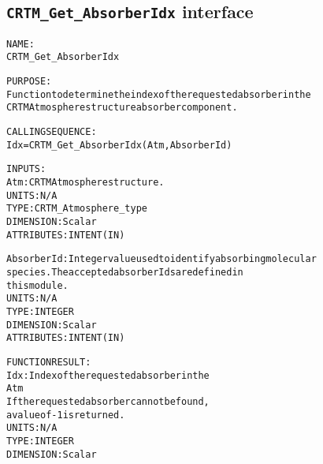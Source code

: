 \subsection{\texttt{CRTM\_Get\_AbsorberIdx} interface}
  \label{sec:CRTM_Get_AbsorberIdx_interface}
  \begin{alltt}
 
  NAME:
        CRTM_Get_AbsorberIdx
 
  PURPOSE:
        Function to determine the index of the requested absorber in the
        CRTM Atmosphere structure absorber component.
 
  CALLING SEQUENCE:
        Idx = CRTM_Get_AbsorberIdx(Atm, AbsorberId)
 
  INPUTS:
        Atm:          CRTM Atmosphere structure.
                      UNITS:      N/A
                      TYPE:       CRTM_Atmosphere_type
                      DIMENSION:  Scalar
                      ATTRIBUTES: INTENT(IN)
 
        AbsorberId:   Integer value used to identify absorbing molecular
                      species. The accepted absorber Ids are defined in
                      this module.
                      UNITS:      N/A
                      TYPE:       INTEGER
                      DIMENSION:  Scalar
                      ATTRIBUTES: INTENT(IN)
 
  FUNCTION RESULT:
        Idx:          Index of the requested absorber in the
                      Atm%Absorber array component.
                      If the requested absorber cannot be found,
                      a value of -1 is returned.
                      UNITS:      N/A
                      TYPE:       INTEGER
                      DIMENSION:  Scalar
 
  \end{alltt}

